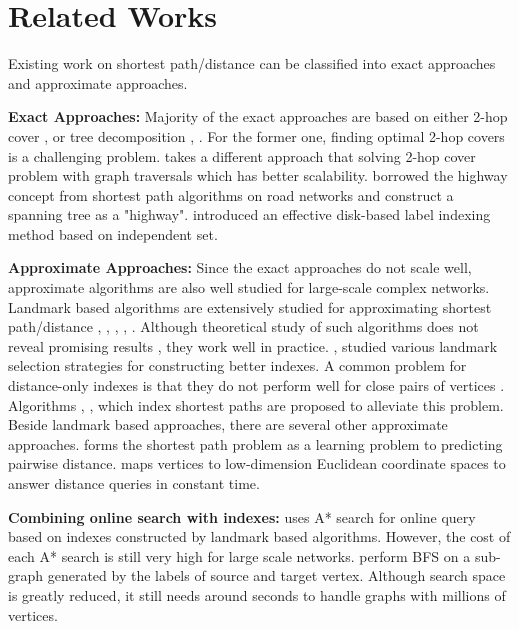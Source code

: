 \section{Related Works}
\label{relatedwork}

Existing work on shortest path/distance can be classified into exact approaches and approximate approaches. 

\textbf{Exact Approaches:} Majority of the exact approaches are based on either 2-hop cover \cite{Cohen:2002:RDQ:545381.545503}, \cite{Akiba:2013:FES:2463676.2465315} or tree decomposition \cite{Akiba:2012:SQC:2247596.2247614}, \cite{Wei:2010:TES:1807167.1807181}. For the former one, finding optimal 2-hop covers is a challenging problem. \cite{Akiba:2013:FES:2463676.2465315} takes a different approach that solving 2-hop cover problem with graph traversals which has better scalability. \cite{Jin:2012:HLA:2213836.2213887} borrowed the highway concept from shortest path algorithms on road networks and construct a spanning tree as a "highway". \cite{Fu:2013:IIB:2536336.2536346} introduced an effective disk-based label indexing method based on independent set.

\textbf{Approximate Approaches:} Since the exact approaches do not scale well, approximate algorithms are also well studied for large-scale complex networks. Landmark based algorithms are extensively studied for approximating shortest path/distance \cite{Thorup:2005:ADO:1044731.1044732}, \cite{Goldberg:2005:CSP:1070432.1070455}, \cite{Potamias:2009:FSP:1645953.1646063}, \cite{floreskul2014memory}, \cite{Maier:2011:INS:1993077.1993079}. Although theoretical study of such algorithms does not reveal promising results \cite{Thorup:2005:ADO:1044731.1044732}, they work well in practice. \cite{Potamias:2009:FSP:1645953.1646063}, \cite{6927522} studied various landmark selection strategies for constructing better indexes. A common problem for distance-only indexes is that they do not perform well for close pairs of vertices \cite{Akiba:2012:SQC:2247596.2247614}. Algorithms \cite{Gubichev:2010:FAE:1871437.1871503}, \cite{tretyakov2011fast}, \cite{6399472} which index shortest paths are proposed to alleviate this problem. Beside landmark based approaches, there are several other approximate approaches. \cite{7004250} forms the shortest path problem as a learning problem to predicting pairwise distance. \cite{Zhao:2010:OSP:1863190.1863199} maps vertices to low-dimension Euclidean coordinate spaces to answer distance queries in constant time.

\textbf{Combining online search with indexes:}
\cite{Goldberg:2005:CSP:1070432.1070455} uses A* search for online query based on indexes constructed by landmark based algorithms. However, the cost of each A* search is still very high for large scale networks. \cite{Gubichev:2010:FAE:1871437.1871503} perform BFS on a sub-graph generated by the labels of source and target vertex. Although search space is greatly reduced, it still needs around seconds to handle graphs with millions of vertices.
